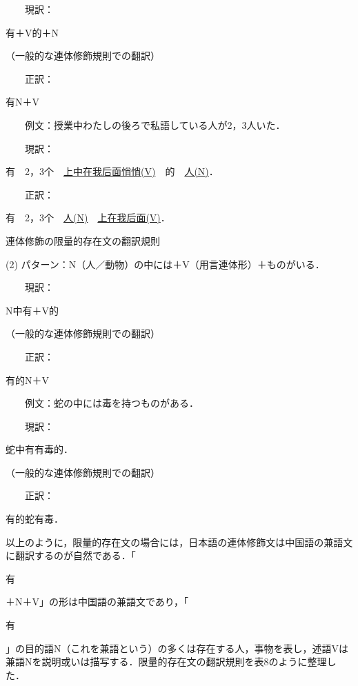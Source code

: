 \documentclass[japanese]{jnlp_1.4}
\begin{document}
　　現訳：\begin{簡体中文}有＋V的＋N\end{簡体中文}\hfill （一般的な連体修飾規則での翻訳）

　　正訳：\begin{簡体中文}有N＋V\end{簡体中文}

　　例文：授業中わたしの後ろで私語している人が2，3人いた．

　　現訳：\begin{簡体中文}有　2，3个　\ul{\mbox{上中在我后面悄悄(V)}}　的　\ul{\mbox{人(N)}}．\end{簡体中文}

　　正訳：\begin{簡体中文}有　2，3个　\ul{\mbox{人(N)}}　\ul{\mbox{上在我后面(V)}}．\end{簡体中文}

\begin{table}[b]
\caption{連体修飾の限量的存在文の翻訳規則}

\end{table}

\noindent
(2) パターン：N（人／動物）の中には＋V（用言連体形）＋ものがいる．

　　現訳：\begin{簡体中文}N中有＋V的\end{簡体中文}\hfill （一般的な連体修飾規則での翻訳）

　　正訳：\begin{簡体中文}有的N＋V\end{簡体中文}

　　例文：蛇の中には毒を持つものがある．

　　現訳：\begin{簡体中文}蛇中有有毒的．\end{簡体中文}\hfill （一般的な連体修飾規則での翻訳）

　　正訳：\begin{簡体中文}有的蛇有毒．\end{簡体中文}

以上のように，限量的存在文の場合には，日本語の連体修飾文は中国語の兼語文に翻訳するのが自然である．「\begin{簡体中文}有\end{簡体中文}＋N＋V」の形は中国語の兼語文であり，「\begin{簡体中文}有\end{簡体中文}」の目的語N（これを兼語という）の多くは存在する人，事物を表し，述語Vは兼語Nを説明或いは描写する．限量的存在文の翻訳規則を表8のように整理した．
\end{document}
